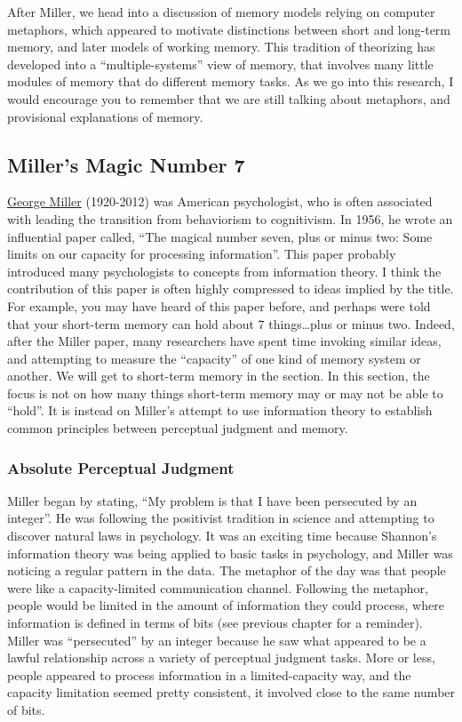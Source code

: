 \documentclass[
  oneside,
  12pt]{crumpbook}
\begin{document}
After Miller, we head into a discussion of memory models relying on computer metaphors, which appeared to motivate distinctions between short and long-term memory, and later models of working memory. This tradition of theorizing has developed into a ``multiple-systems'' view of memory, that involves many little modules of memory that do different memory tasks. As we go into this research, I would encourage you to remember that we are still talking about metaphors, and provisional explanations of memory.

\hypertarget{millers-magic-number-7}{%
\subsection{Miller's Magic Number 7}\label{millers-magic-number-7}}

\href{https://en.wikipedia.org/wiki/George_Armitage_Miller}{George Miller} (1920-2012) was American psychologist, who is often associated with leading the transition from behaviorism to cognitivism. In 1956, he wrote an influential paper called, ``The magical number seven, plus or minus two: Some limits on our capacity for processing information''. This paper probably introduced many psychologists to concepts from information theory. I think the contribution of this paper is often highly compressed to ideas implied by the title. For example, you may have heard of this paper before, and perhaps were told that your short-term memory can hold about 7 things\ldots plus or minus two. Indeed, after the Miller paper, many researchers have spent time invoking similar ideas, and attempting to measure the ``capacity'' of one kind of memory system or another. We will get to short-term memory in the section. In this section, the focus is not on how many things short-term memory may or may not be able to ``hold''. It is instead on Miller's attempt to use information theory to establish common principles between perceptual judgment and memory.

\hypertarget{absolute-perceptual-judgment}{%
\subsubsection{Absolute Perceptual Judgment}\label{absolute-perceptual-judgment}}

Miller began by stating, ``My problem is that I have been persecuted by an integer''. He was following the positivist tradition in science and attempting to discover natural laws in psychology. It was an exciting time because Shannon's information theory was being applied to basic tasks in psychology, and Miller was noticing a regular pattern in the data. The metaphor of the day was that people were like a capacity-limited communication channel. Following the metaphor, people would be limited in the amount of information they could process, where information is defined in terms of bits (see previous chapter for a reminder). Miller was ``persecuted'' by an integer because he saw what appeared to be a lawful relationship across a variety of perceptual judgment tasks. More or less, people appeared to process information in a limited-capacity way, and the capacity limitation seemed pretty consistent, it involved close to the same number of bits.
\end{document}
